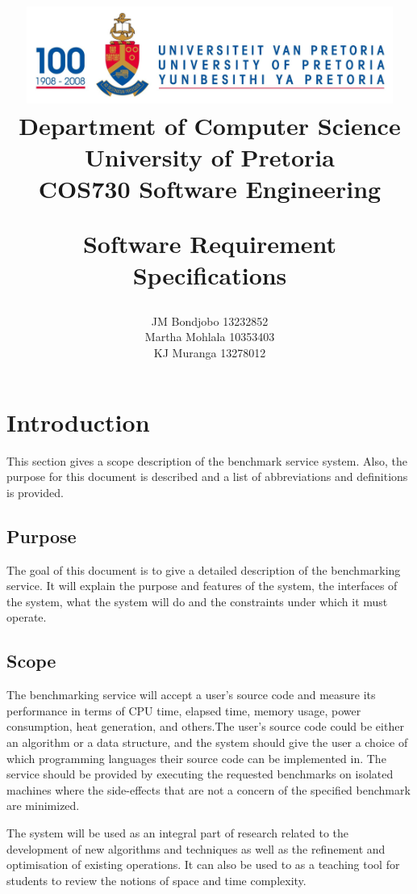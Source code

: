 \documentclass[a4paper,12pt]{article}
\title{\includegraphics[width=12cm]{Eeufeeslogo.jpg} \\
       Department of Computer Science \\
       University of Pretoria \\
       \vspace{0.5cm}
       COS730 Software Engineering \\
       \vspace{0.5cm}
       \begin{large} \textbf{Software Requirement Specifications}\end{large}}
\date{}
\author{	JM Bondjobo		13232852 		\\
		Martha Mohlala		10353403
		 \\
		 KJ Muranga         13278012        \\
}
\begin{document}
\maketitle
\thispagestyle{empty}
\clearpage

\newpage
{}
\thispagestyle{empty}
\tableofcontents
\clearpage

\newpage
{}

\section {Introduction}
This section gives a scope description of the benchmark service system. Also, the purpose for this document is described and a list of abbreviations and definitions is provided.
\subsection{Purpose}
The goal of this document is to give a detailed description of the  benchmarking service. It will explain the purpose and features of the system, the interfaces of the system, what the system will do and the constraints under which it must operate.


\subsection{Scope}
The benchmarking service will accept a user's source code and measure its performance in terms of CPU time, elapsed time, memory usage, power consumption, heat generation, and others.The user's source code could be either an algorithm or a data structure, and the system should give the user a choice of which programming languages their source code can be implemented in. The service should be provided by executing the requested benchmarks on isolated machines where the side-effects that are not a concern of the specified benchmark are minimized.

The system will be used as an integral part of research related to the development of new algorithms and techniques as well as the refinement and optimisation of existing operations. It can also be used to as a teaching tool for students to review the notions of space and time complexity.
\end{document}
